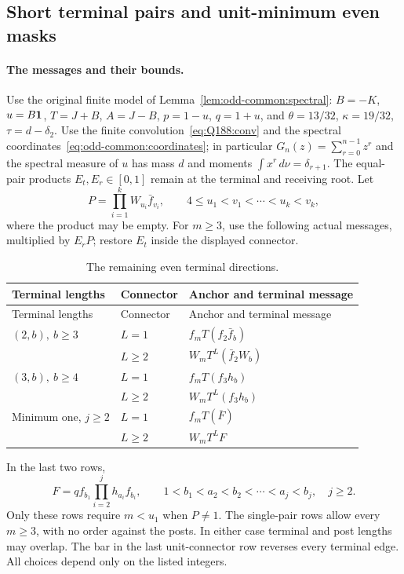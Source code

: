 \subsection{Short terminal pairs and unit-minimum even masks}\label{proof:R2-C043}

\paragraph{The messages and their bounds.}\label{part:R43.1}
Use the original finite model of Lemma~\ref{lem:odd-common:spectral}:
\(B=-K\), \(u=B\mathbf1\), \(T=J+B\), \(A=J-B\),
\(p=1-u\), \(q=1+u\), and \(\theta=13/32\),
\(\kappa=19/32\), \(\tau=d-\delta_2\).
Use the finite convolution~\eqref{eq:Q188:conv} and the spectral
coordinates~\eqref{eq:odd-common:coordinates}; in particular
\(G_n(z)=\sum_{r=0}^{n-1}z^r\) and the spectral measure of \(u\)
has mass \(d\) and moments \(\int x^r\,d\nu=\delta_{r+1}\).
The equal-pair products \(E_t,E_r\in[0,1]\) remain at the terminal
and receiving root. Let
\[
 P=\prod_{i=1}^k W_{u_i}\bar f_{v_i},\qquad
 4\le u_1<v_1<\cdots<u_k<v_k,
\]
where the product may be empty. For \(m\ge3\), use the following
actual messages, multiplied by \(E_rP\); restore \(E_t\) inside
the displayed connector.
\begin{longtable}{@{}lll@{}}
\caption{The remaining even terminal directions.}\label{tab:R43:directions}\\
\toprule
Terminal lengths&Connector&Anchor and terminal message\\\midrule
\endfirsthead
\toprule Terminal lengths&Connector&Anchor and terminal message\\\midrule
\endhead\bottomrule\endfoot
\((2,b),\ b\ge3\)&\(L=1\)&\(f_mT(f_2\bar f_b)\)\\
 &\(L\ge2\)&\(W_mT^L(\bar f_2W_b)\)\\
\((3,b),\ b\ge4\)&\(L=1\)&\(f_mT(f_3h_b)\)\\
 &\(L\ge2\)&\(W_mT^L(f_3h_b)\)\\
Minimum one, \(j\ge2\)&\(L=1\)&\(f_mT(\overline F)\)\\
 &\(L\ge2\)&\(W_mT^LF\)\\
\end{longtable}
In the last two rows,
\[
 F=qf_{b_1}\prod_{i=2}^j h_{a_i}f_{b_i},\qquad
 1<b_1<a_2<b_2<\cdots<a_j<b_j,\quad j\ge2.
\]
Only these rows require \(m<u_1\) when \(P\ne1\).
The single-pair rows allow every \(m\ge3\), with no order against
the posts. In either case terminal and post lengths may overlap.
The bar in the last unit-connector row reverses every terminal edge.
All choices depend only on the listed integers.

